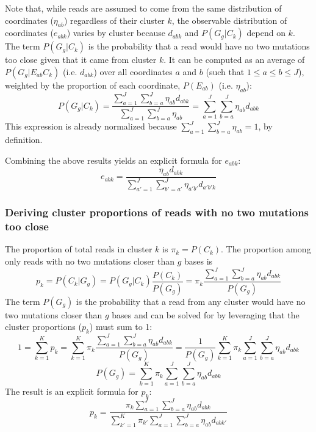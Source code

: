 \documentclass{article}
\begin{document}
Note that, while reads are assumed to come from the same distribution of coordinates ($\eta_{ab}$) regardless of their cluster $k$, the observable distribution of coordinates ($e_{abk}$) varies by cluster because $d_{abk}$ and $P(G_g | C_k)$ depend on $k$.
The term $P(G_g | C_k)$ is the probability that a read would have no two mutations too close given that it came from cluster $k$.
It can be computed as an average of $P(G_g | E_{ab} C_k)$ (i.e. $d_{abk}$) over all coordinates $a$ and $b$ (such that $1 \le a \le b \le J$), weighted by the proportion of each coordinate, $P(E_{ab})$ (i.e. $\eta_{ab}$):
\begin{equation}
    P(G_g | C_k) = \frac{\sum_{a=1}^{J} \sum_{b=a}^{J} \eta_{ab} d_{abk}}{\sum_{a=1}^{J} \sum_{b=a}^{J} \eta_{ab}} = \sum_{a=1}^{J} \sum_{b=a}^{J} \eta_{ab} d_{abk}
\end{equation}
This expression is already normalized because $\sum_{a=1}^{J} \sum_{b=a}^{J} \eta_{ab} = 1$, by definition.

Combining the above results yields an explicit formula for $e_{abk}$:
\begin{equation}
    e_{abk} = \frac{\eta_{ab} d_{abk}}{\sum_{a'=1}^{J} \sum_{b'=a'}^{J} \eta_{a'b'} d_{a'b'k}}
\end{equation}

\subsubsection{Deriving cluster proportions of reads with no two mutations too close}
\label{calc_p_clust_noclose}

The proportion of total reads in cluster $k$ is $\pi_k = P(C_k)$.
The proportion among only reads with no two mutations closer than $g$ bases is
\begin{equation}
    p_k = P(C_k | G_g) = P(G_g | C_k) \frac{P(C_k)}{P(G_g)} = \pi_k \frac{\sum_{a=1}^{J} \sum_{b=a}^{J} \eta_{ab} d_{abk}}{P(G_g)}
\end{equation}
The term $P(G_g)$ is the probability that a read from any cluster would have no two mutations closer than $g$ bases and can be solved for by leveraging that the cluster proportions ($p_k$) must sum to 1:
\begin{equation}
    1 = \sum_{k=1}^{K} p_k = \sum_{k=1}^{K} \pi_k \frac{\sum_{a=1}^{J} \sum_{b=a}^{J} \eta_{ab} d_{abk}}{P(G_g)} = \frac{1}{{P(G_g)}} \sum_{k=1}^{K} \pi_k \sum_{a=1}^{J} \sum_{b=a}^{J} \eta_{ab} d_{abk}
\end{equation}
\begin{equation}
    P(G_g) = \sum_{k=1}^{K} \pi_k \sum_{a=1}^{J} \sum_{b=a}^{J} \eta_{ab} d_{abk}
\end{equation}
The result is an explicit formula for $p_k$:
\begin{equation}
    p_k = \frac{\pi_k \sum_{a=1}^{J} \sum_{b=a}^{J} \eta_{ab} d_{abk}}{\sum_{k'=1}^{K} \pi_{k'} \sum_{a=1}^{J} \sum_{b=a}^{J} \eta_{ab} d_{abk'}}
\end{equation}
\end{document}
